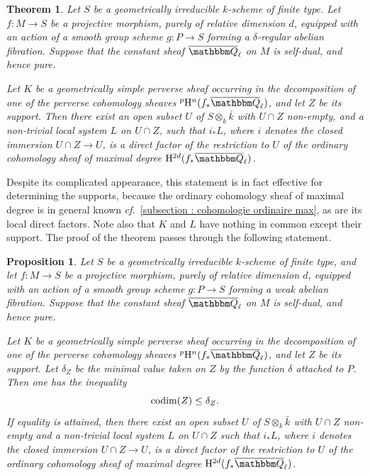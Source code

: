 \documentclass[12pt,english]{smfart}
\numberwithin{equation}{subsection}
\newtheorem{proposition}[equation]{Proposition}
\newtheorem{theoreme}[equation]{Theorem}
\theoremstyle{remark}
\newcommand\QQ{{\mathbbm Q}}
\newcommand\rmH{{\rm H}}
\newcommand\cf{{\it cf.\ }}
\newcommand\Ql{{\overline\QQ_\ell}}
\begin{document}
\begin{theoreme}\label{support general}
Let $S$ be a geometrically irreducible $k$-scheme of finite type. Let $f:M\rightarrow S$ be a projective morphism, purely of relative dimension $d$, equipped with an action of a smooth group scheme $g:P\rightarrow S$ forming a $\delta$-regular abelian fibration. Suppose that the constant sheaf $\Ql$ on $M$ is self-dual, and hence pure.

Let $K$ be a geometrically simple perverse sheaf occurring in the decomposition of one of the perverse cohomology sheaves ${}^p\rmH^n(f_*\Ql)$, and let $Z$ be its support. Then there exist an open subset $U$ of $S\otimes_k\bar k$ with $U\cap Z$ non-empty, and a non-trivial local system $L$ on $U\cap Z$, such that $i_*L$, where $i$ denotes the closed immersion $U\cap Z\rightarrow U$, is a direct factor of the restriction to $U$ of the ordinary cohomology sheaf of maximal degree $\rmH^{2d}(f_*\Ql)$.
\end{theoreme}

Despite its complicated appearance, this statement is in fact effective for determining the supports, because the ordinary cohomology sheaf of maximal degree is in general known \cf \ref{subsection : cohomologie ordinaire max}, as are its local direct factors. Note also that $K$ and $L$ have nothing in common except their support. The proof of the theorem passes through the following statement.

\begin{proposition}\label{inegalite delta}
Let $S$ be a geometrically irreducible $k$-scheme of finite type, and let $f:M\rightarrow S$ be a projective morphism, purely of relative dimension $d$, equipped with an action of a smooth group scheme $g:P\rightarrow S$ forming a weak abelian fibration. Suppose that the constant sheaf $\Ql$ on $M$ is self-dual, and hence pure.

Let $K$ be a geometrically simple perverse sheaf occurring in the decomposition of one of the perverse cohomology sheaves ${}^p\rmH^n(f_*\Ql)$, and let $Z$ be its support. Let $\delta_Z$ be the minimal value taken on $Z$ by the function $\delta$ attached to $P$. Then one has the inequality
$${\rm codim}(Z)\leq \delta_Z.$$
If equality is attained, then there exist an open subset $U$ of $S\otimes_k\bar k$ with $U\cap Z$ non-empty and a non-trivial local system $L$ on $U\cap Z$ such that $i_*L$, where $i$ denotes the closed immersion $U\cap Z\rightarrow U$, is a direct factor of the restriction to $U$ of the ordinary cohomology sheaf of maximal degree $\rmH^{2d}(f_*\Ql)$.
\end{proposition}
\end{document}
